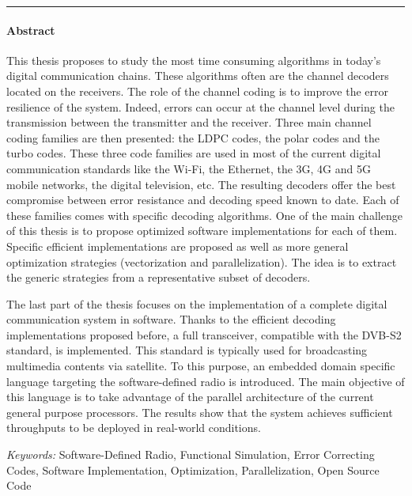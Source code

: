\documentclass[a4paper, 11pt]{article}
\begin{document}
\vskip1.0cm
{\color{bleuUni}\hrule}
\vskip0.5cm

\paragraph{Abstract}

This thesis proposes to study the most time consuming algorithms in today's
digital communication chains. These algorithms often are the channel decoders
located on the receivers. The role of the channel coding is to improve the error
resilience of the system. Indeed, errors can occur at the channel level during
the transmission between the transmitter and the receiver. Three main channel
coding families are then presented: the LDPC codes, the polar codes and the
turbo codes. These three code families are used in most of the current digital
communication standards like the Wi-Fi, the Ethernet, the 3G, 4G and 5G mobile
networks, the digital television, etc. The resulting decoders offer the best
compromise between error resistance and decoding speed known to date. Each of
these families comes with specific decoding algorithms. One of the main
challenge of this thesis is to propose optimized software implementations for
each of them. Specific efficient implementations are proposed as well as more
general optimization strategies (vectorization and parallelization). The idea is
to extract the generic strategies from a representative subset of decoders.

The last part of the thesis focuses on the implementation of a complete digital
communication system in software. Thanks to the efficient decoding
implementations proposed before, a full transceiver, compatible with the DVB-S2
standard, is implemented. This standard is typically used for broadcasting
multimedia contents via satellite. To this purpose, an embedded domain specific
language targeting the software-defined radio is introduced. The main objective
of this language is to take advantage of the parallel architecture of the
current general purpose processors. The results show that the system achieves
sufficient throughputs to be deployed in real-world conditions.

\vskip0.5cm
\emph{Keywords:} Software-Defined Radio, Functional Simulation, Error
                 Correcting Codes, Software Implementation, Optimization,
                 Parallelization, Open Source Code
\end{document}

